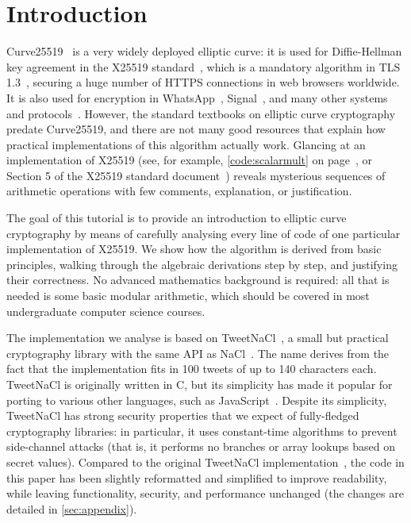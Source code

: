 \documentclass[manuscript]{acmart}
\begin{document}
\section{Introduction}

Curve25519~\cite{Bernstein:2006kw} is a very widely deployed elliptic curve: it is used for Diffie-Hellman key agreement in the X25519 standard~\cite{X25519}, which is a mandatory algorithm in TLS 1.3~\cite{TLS13}, securing a huge number of HTTPS connections in web browsers worldwide.
It is also used for encryption in WhatsApp~\cite{WhatsAppWhitepaper}, Signal~\cite{Marlinspike:2016}, and many other systems and protocols~\cite{UseCurve25519}.
However, the standard textbooks on elliptic curve cryptography \cite{Blake:1999,Cohen:2006,Hankerson:2004,Koblitz:1994} predate Curve25519, and there are not many good resources that explain how practical implementations of this algorithm actually work.
Glancing at an implementation of X25519 (see, for example, \autoref{code:scalarmult} on page~\pageref{code:scalarmult}, or Section 5 of the X25519 standard document~\cite{X25519}) reveals mysterious sequences of arithmetic operations with few comments, explanation, or justification.

The goal of this tutorial is to provide an introduction to elliptic curve cryptography by means of carefully analysing every line of code of one particular implementation of X25519.
We show how the algorithm is derived from basic principles, walking through the algebraic derivations step by step, and justifying their correctness.
No advanced mathematics background is required: all that is needed is some basic modular arithmetic, which should be covered in most undergraduate computer science courses.

The implementation we analyse is based on TweetNaCl~\cite{Bernstein:2014ca,TweetNaCl}, a small but practical cryptography library with the same API as NaCl~\cite{NaCl,Bernstein:2012}.
The name derives from the fact that the implementation fits in 100 tweets of up to 140 characters each.
TweetNaCl is originally written in C, but its simplicity has made it popular for porting to various other languages, such as JavaScript~\cite{TweetNaCljs}.
Despite its simplicity, TweetNaCl has strong security properties that we expect of fully-fledged cryptography libraries: in particular, it uses constant-time algorithms to prevent side-channel attacks (that is, it performs no branches or array lookups based on secret values).
Compared to the original TweetNaCl implementation~\cite{TweetNaCl}, the code in this paper has been slightly reformatted and simplified to improve readability, while leaving functionality, security, and performance unchanged (the changes are detailed in \autoref{sec:appendix}).
\end{document}
